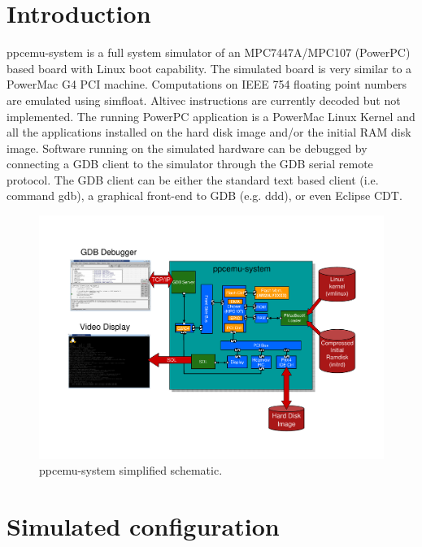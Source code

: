 \section{Introduction}

ppcemu-system is a full system simulator of an MPC7447A/MPC107 (PowerPC) based board with Linux boot capability. The simulated board is very similar to a PowerMac G4 PCI machine. Computations on IEEE 754 floating point numbers are emulated using simfloat. Altivec instructions are currently decoded but not implemented. The running PowerPC application is a PowerMac Linux Kernel and all the applications installed on the hard disk image and/or the initial RAM disk image. Software running on the simulated hardware can be debugged by connecting a GDB client to the simulator through the GDB serial remote protocol. The GDB client can be either the standard text based client (i.e. command gdb), a graphical front-end to GDB (e.g. ddd), or even Eclipse CDT.

\begin{figure}[!h]
	\begin{center}
		\includegraphics[width=\textwidth]{ppcemu_system/fig_ppcemu_system.pdf}
	\end{center}
	\caption{ppcemu-system simplified schematic.}
	\label{fig:ppcemu_system}
\end{figure}

\section{Simulated configuration}


